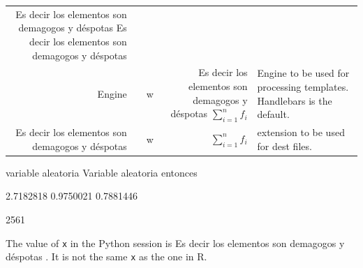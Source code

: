 \documentclass[10pt,]{krantz}
\theoremstyle{definition}
\theoremstyle{definition}
\theoremstyle{definition}
\theoremstyle{definition}
\theoremstyle{remark}
\begin{document}
\begin{longtable}[]{@{}rclrl@{}}
\begin{minipage}[t]{0.49\columnwidth}
Es decir los elementos son demagogos y déspotas Es decir los elementos son demagogos y déspotas\strut
\end{minipage}\tabularnewline
\begin{minipage}[t]{0.10\columnwidth}\raggedleft
Engine\strut
\end{minipage} & \begin{minipage}[t]{0.04\columnwidth}\centering
2\strut
\end{minipage} & \begin{minipage}[t]{0.02\columnwidth}\raggedright
w\strut
\end{minipage} & \begin{minipage}[t]{0.21\columnwidth}\raggedleft
Es decir los elementos son demagogos y déspotas \(\sum^{n}_{i=1}{f_i}\)\strut
\end{minipage} & \begin{minipage}[t]{0.49\columnwidth}\raggedright
Engine to be used for processing templates. Handlebars is the default.\strut
\end{minipage}\tabularnewline
\begin{minipage}[t]{0.10\columnwidth}\raggedleft
Es decir los elementos son demagogos y déspotas\strut
\end{minipage} & \begin{minipage}[t]{0.04\columnwidth}\centering
3\strut
\end{minipage} & \begin{minipage}[t]{0.02\columnwidth}\raggedright
w\strut
\end{minipage} & \begin{minipage}[t]{0.21\columnwidth}\raggedleft
\(\sum^{n}_{i=1}{f_i}\)\strut
\end{minipage} & \begin{minipage}[t]{0.49\columnwidth}\raggedright
extension to be used for dest files.\strut
\end{minipage}\tabularnewline
\bottomrule
\end{longtable}

variable aleatoria Variable aleatoria entonces

2.7182818 0.9750021 0.7881446

2561

The value of \texttt{x} in the Python session is Es decir los elementos son demagogos y déspotas .
It is not the same \texttt{x} as the one in R.
\end{document}
